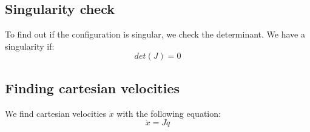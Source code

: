 \documentclass{article}
\begin{document}
\subsection{Singularity check}
To find out if the configuration is singular, we check the determinant. We have a singularity if:
\begin{equation}
det(J) = 0
\end{equation}
\subsection{Finding cartesian velocities}
We find cartesian velocities $\dot{x}$ with the following equation:
\begin{equation}
\dot{x} = J\dot{q}
\end{equation}
\end{document}
